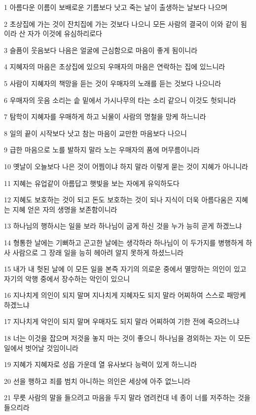 \par 1 아름다운 이름이 보배로운 기름보다 낫고 죽는 날이 출생하는 날보다 나으며
\par 2 초상집에 가는 것이 잔치집에 가는 것보다 나으니 모든 사람의 결국이 이와 같이 됨이라 산 자가 이것에 유심하리로다
\par 3 슬픔이 웃음보다 나음은 얼굴에 근심함으로 마음이 좋게 됨이니라
\par 4 지혜자의 마음은 초상집에 있으되 우매자의 마음은 연락하는 집에 있느니라
\par 5 사람이 지혜자의 책망을 듣는 것이 우매자의 노래를 듣는 것보다 나으니라
\par 6 우매자의 웃음 소리는 솥 밑에서 가시나무의 타는 소리 같으니 이것도 헛되니라
\par 7 탐학이 지혜자를 우매하게 하고 뇌물이 사람의 명철을 망케 하느니라
\par 8 일의 끝이 시작보다 낫고 참는 마음이 교만한 마음보다 나으니
\par 9 급한 마음으로 노를 발하지 말라 노는 우매자의 품에 머무름이니라
\par 10 옛날이 오늘보다 나은 것이 어찜이냐 하지 말라 이렇게 묻는 것이 지혜가 아니니라
\par 11 지혜는 유업같이 아름답고 햇빛을 보는 자에게 유익하도다
\par 12 지혜도 보호하는 것이 되고 돈도 보호하는 것이 되나 지식이 더욱 아름다움은 지혜는 지혜 얻은 자의 생명을 보존함이니라
\par 13 하나님의 행하시는 일을 보라 하나님이 굽게 하신 것을 누가 능히 곧게 하겠느냐
\par 14 형통한 날에는 기뻐하고 곤고한 날에는 생각하라 하나님이 이 두가지를 병행하게 하사 사람으로 그 장래 일을 능히 헤아려 알지 못하게 하셨느니라
\par 15 내가 내 헛된 날에 이 모든 일을 본즉 자기의 의로운 중에서 멸망하는 의인이 있고 자기의 악행 중에서 장수하는 악인이 있으니
\par 16 지나치게 의인이 되지 말며 지나치게 지혜자도 되지 말라 어찌하여 스스로 패망케 하겠느냐
\par 17 지나치게 악인이 되지 말며 우매자도 되지 말라 어찌하여 기한 전에 죽으려느냐
\par 18 너는 이것을 잡으며 저것을 놓지 마는 것이 좋으니 하나님을 경외하는 자는 이 모든 일에서 벗어날 것임이니라
\par 19 지혜가 지혜자로 성읍 가운데 열 유사보다 능력이 있게 하느니라
\par 20 선을 행하고 죄를 범치 아니하는 의인은 세상에 아주 없느니라
\par 21 무릇 사람의 말을 들으려고 마음을 두지 말라 염려컨대 네 종이 너를 저주하는 것을 들으리라
